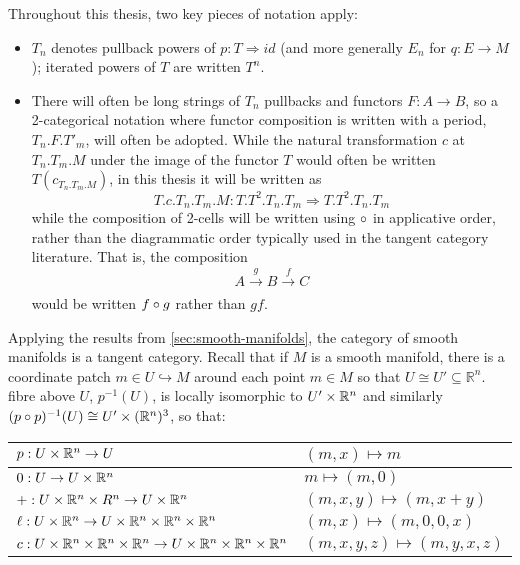 \begin{notation}
Throughout this thesis, two key pieces of notation apply:
    \begin{itemize}
        \item $T_n$ denotes pullback powers of $p:T \Rightarrow id$ (and more generally $E_n$ for $q:E \to M$); iterated powers of $T$ are written $T^n$.
        \item There will often be long strings of $T_n$ pullbacks and functors $F:A \to B$, so a 2-categorical notation where functor composition is written with a period, $T_n.F.T'_m$, will often be adopted. While the natural transformation $c$ at $T_n.T_m.M$ under the image of the functor $T$ would often be written $T(c_{T_n.T_m.M})$, in this thesis it will be written as
        \[
            T.c.T_n.T_m.M:T.T^2.T_n.T_m \Rightarrow T.T^2.T_n.T_m
        \]  
        while the composition of 2-cells will be written using $\circ$ in applicative order, rather than the diagrammatic order typically used in the tangent category literature. That is, the composition
        \[
            A \xrightarrow[]{g} B \xrightarrow[]{f} C
        \]
        would be written $f \circ g$ rather than $gf$.
    \end{itemize}
\end{notation}
\begin{example}\label{example:tangcat-sman}
    Applying the results from \cref{sec:smooth-manifolds}, the category of smooth manifolds is a tangent category. 
    Recall that if $M$ is a smooth manifold, there is a coordinate patch $m \in U \hookrightarrow M$ around each point $m \in M$ so that $U \cong U' \subseteq \mathbb{R}^n$.
    fibre above $U$, $p^{-1}(U)$, is locally isomorphic to $U' \times \mathbb{R}^n$ and similarly $(p \circ p)^{-1}(U) \cong U' \times (\mathbb{R}^n)^3$, so that:
    \begin{center}
        \begin{tabular}{|l|l|}
            \hline
            $p:U \times \mathbb{R}^n \to U$  & $(m,x) \mapsto m$ \\ \hline
            $0: U \to U \times \mathbb{R}^n$ & $m \mapsto (m,0)$ \\ \hline
            $+:U \times \mathbb{R}^n \times R^n \to U \times \mathbb{R}^n$                         & $(m,x,y) \mapsto (m, x+y)$      \\ \hline
            $\ell:U \times \mathbb{R}^n \to U \times \mathbb{R}^n \times \mathbb{R}^n\times \mathbb{R}^n$              & $(m,x) \mapsto (m,0,0,x)$       \\ \hline
            $c: U \times \mathbb{R}^n \times \mathbb{R}^n\times \mathbb{R}^n \to U \times \mathbb{R}^n \times \mathbb{R}^n\times \mathbb{R}^n$ & $(m, x,y,z) \mapsto (m, y,x,z)$ \\ \hline
        \end{tabular}
    \end{center}
\end{example}

